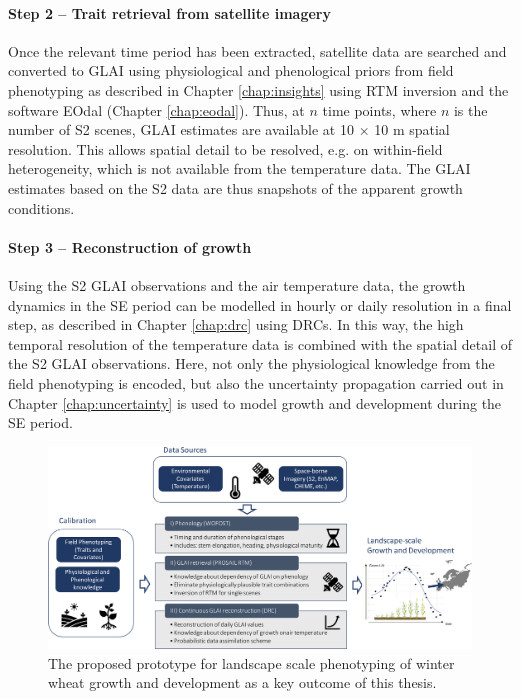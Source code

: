 \paragraph{Step 2 -- Trait retrieval from satellite imagery}
Once the relevant time period has been extracted, satellite data are searched and converted to \gls{GLAI} using physiological and phenological priors from field phenotyping as described in Chapter \ref{chap:insights} using RTM inversion and the software \gls{EOdal} (Chapter \ref{chap:eodal}). Thus, at $n$ time points, where $n$ is the number of \gls{S2} scenes, \gls{GLAI} estimates are available at 10 $\times$ 10 m spatial resolution. This allows spatial detail to be resolved, e.g. on within-field heterogeneity, which is not available from the temperature data. The \gls{GLAI} estimates based on the \gls{S2} data are thus snapshots of the apparent growth conditions.

\paragraph{Step 3 -- Reconstruction of growth}
Using the \gls{S2} \gls{GLAI} observations and the air temperature data, the growth dynamics in the \gls{SE} period can be modelled in hourly or daily resolution in a final step, as described in Chapter \ref{chap:drc} using \gls{DRC}s. In this way, the high temporal resolution of the temperature data is combined with the spatial detail of the \gls{S2} \gls{GLAI} observations. Here, not only the physiological knowledge from the field phenotyping is encoded, but also the uncertainty propagation carried out in Chapter \ref{chap:uncertainty} is used to model growth and development during the \gls{SE} period.

\begin{figure}[H]
    \centering
    \includegraphics[width=\textwidth]{07-Discussion/img/prototype.jpg}
    \caption{The proposed prototype for landscape scale phenotyping of winter wheat growth and development as a key outcome of this thesis.}
    \label{fig:oa-disc-prototype}
\end{figure}

